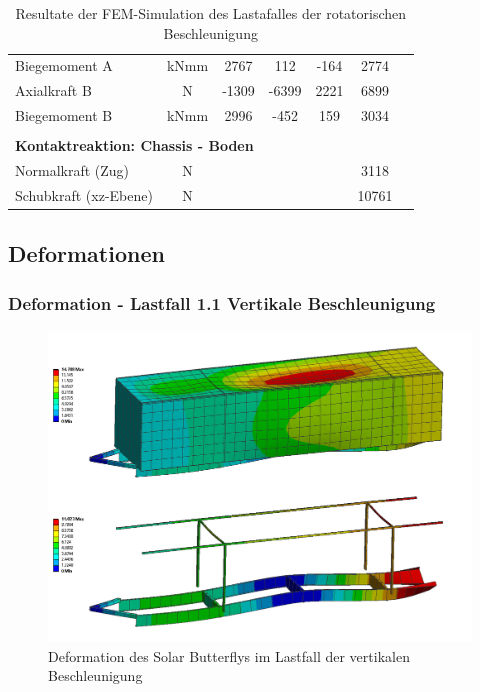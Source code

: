 \begin{table}[H]
\begin{tabular}{lcccccc}
  Biegemoment A	&	kNmm	&	2767	&	112	&	-164	&	2774	&		\\
  Axialkraft B	&	N	&	-1309	&	-6399	&	2221	&	6899	&		\\
  Biegemoment B	&	kNmm	&	2996	&	-452	&	159	&	3034	&		\\	\hline	\\
  \multicolumn{5}{l}{\textbf{Kontaktreaktion: Chassis - Boden}}									&		&		\\	\thickhline
  Normalkraft (Zug)	&	N	&		&		&		&	3118	&		\\
  Schubkraft (xz-Ebene)	&	N	&		&		&		&	10761	&		\\	\hline
  \end{tabular}
  \caption{Resultate der FEM-Simulation des Lastafalles der rotatorischen Beschleunigung}
  \label{tab:FEM 1.5}
  \end{table}
    \newpage

\subsection{Deformationen}
\label{FEM Deformation}
\subsubsection{Deformation - Lastfall 1.1 Vertikale Beschleunigung}
\begin{figure}[H]
  \centering
  \includegraphics[width=1\linewidth]{04_figures/FEM 1.1.png}
  \caption{Deformation des Solar Butterflys im Lastfall der vertikalen Beschleunigung}
  \label{FEM 1.1}
\end{figure}

